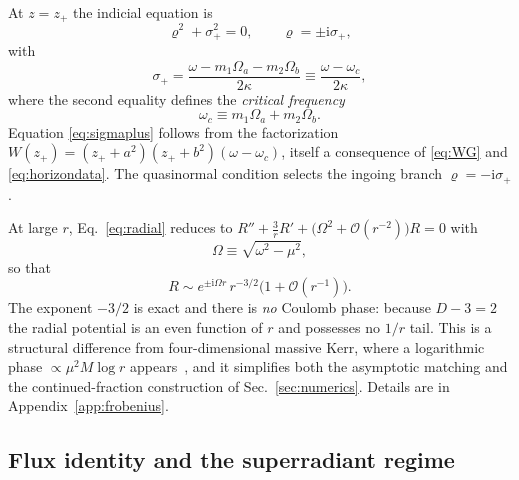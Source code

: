 \documentclass[aps,prd,reprint,superscriptaddress,nofootinbib,longbibliography]{revtex4-2}
\theoremstyle{plain}
\theoremstyle{definition}
\theoremstyle{remark}
\newcommand{\ii}{\mathrm{i}}
\newcommand{\Ord}{\mathcal{O}}
\begin{document}
At $z=z_+$ the indicial equation is
\begin{equation}\label{eq:indicial}
  \varrho^2+\sigma_+^2 = 0,\qquad \varrho=\pm\ii\sigma_+ ,
\end{equation}
with
\begin{equation}\label{eq:sigmaplus}
  \sigma_+ = \frac{\omega-m_1\Omega_a-m_2\Omega_b}{2\kappa}
  \equiv \frac{\omega-\omega_c}{2\kappa},
\end{equation}
where the second equality defines the \emph{critical frequency}
\begin{equation}\label{eq:omegac}
  \omega_c \equiv m_1\Omega_a + m_2\Omega_b .
\end{equation}
Equation \eqref{eq:sigmaplus} follows from the factorization
$W(z_+)=(z_++a^2)(z_++b^2)(\omega-\omega_c)$, itself a consequence of
\eqref{eq:WG} and \eqref{eq:horizondata}. The quasinormal condition selects the
ingoing branch $\varrho=-\ii\sigma_+$.

At large $r$, Eq.~\eqref{eq:radial} reduces to
$R''+\tfrac3r R'+\big(\Omega^2+\Ord(r^{-2})\big)R=0$ with
\begin{equation}\label{eq:Omegadef}
  \Omega \equiv \sqrt{\omega^2-\mu^2},
\end{equation}
so that
\begin{equation}\label{eq:infinityBC}
  R \sim e^{\pm\ii\Omega r}\,r^{-3/2}\big(1+\Ord(r^{-1})\big).
\end{equation}
The exponent $-3/2$ is exact and there is \emph{no} Coulomb phase: because
$D-3=2$ the radial potential is an even function of $r$ and possesses no $1/r$
tail. This is a structural difference from four-dimensional massive Kerr, where
a logarithmic phase $\propto\mu^2 M\log r$
appears~\cite{DetweilerD53,Dolan2007D55}, and it simplifies both the asymptotic
matching and the continued-fraction construction of Sec.~\ref{sec:numerics}.
Details are in Appendix~\ref{app:frobenius}.

\subsection{Flux identity and the superradiant regime}\label{sec:sep:flux}
\end{document}
